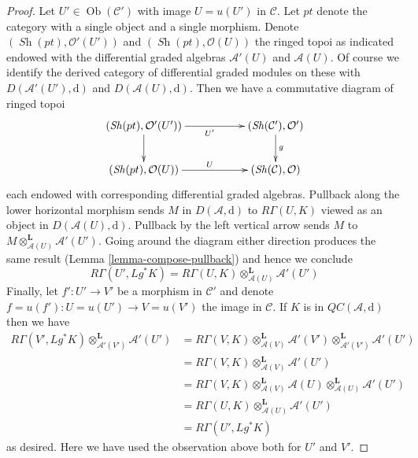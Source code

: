 \documentclass[10pt,a4paper]{amsart}
\theoremstyle{plain}
\theoremstyle{definition}
\theoremstyle{remark}
\numberwithin{equation}{subsection}
\def\Ob{\mathop{\mathrm{Ob}}\nolimits}
\def\Sh{\mathop{\mathit{Sh}}\nolimits}
\begin{document}
\begin{proof}
Let $U' \in \Ob(\mathcal{C}')$ with image $U = u(U')$ in $\mathcal{C}$.
Let $pt$ denote the category with a single object and a single morphism.
Denote $(\Sh(pt), \mathcal{O}'(U'))$ and $(\Sh(pt), \mathcal{O}(U))$
the ringed topoi as indicated endowed with the differential graded
algebras $\mathcal{A}'(U)$ and $\mathcal{A}(U)$.
Of course we identify the derived category of differential graded modules
on these with $D(\mathcal{A}'(U'), \text{d})$ and
$D(\mathcal{A}(U), \text{d})$.
Then we have a commutative diagram of ringed topoi
$$
\xymatrix{
(\Sh(pt), \mathcal{O}'(U')) \ar[rr]_{U'} \ar[d] & &
(\Sh(\mathcal{C}'), \mathcal{O}') \ar[d]^g \\
(\Sh(pt), \mathcal{O}(U)) \ar[rr]^U & &
(\Sh(\mathcal{C}), \mathcal{O})
}
$$
each endowed with corresponding differential graded algebras.
Pullback along the lower horizontal morphism sends $M$ in
$D(\mathcal{A}, \text{d})$ to $R\Gamma(U, K)$ viewed as an
object in $D(\mathcal{A}(U), \text{d})$.
Pullback by the left vertical arrow sends $M$ to
$M \otimes_{\mathcal{A}(U)}^\mathbf{L} \mathcal{A}'(U')$.
Going around the diagram either direction produces the same result
(Lemma \ref{lemma-compose-pullback}) and hence we conclude
$$
R\Gamma(U', Lg^*K) =
R\Gamma(U, K) \otimes_{\mathcal{A}(U)}^\mathbf{L} \mathcal{A}'(U')
$$
Finally, let $f' : U' \to V'$ be a morphism in $\mathcal{C}'$ and
denote $f = u(f') : U = u(U') \to V = u(V')$ the image in $\mathcal{C}$.
If $K$ is in $\mathit{QC}(\mathcal{A}, \text{d})$ then we have
\begin{align*}
R\Gamma(V', Lg^*K) \otimes_{\mathcal{A}'(V')}^\mathbf{L} \mathcal{A}'(U')
& =
R\Gamma(V, K) \otimes_{\mathcal{A}(V)}^\mathbf{L} \mathcal{A}'(V')
\otimes_{\mathcal{A}'(V')}^\mathbf{L} \mathcal{A}'(U') \\
& =
R\Gamma(V, K) \otimes_{\mathcal{A}(V)}^\mathbf{L} \mathcal{A}'(U') \\
& =
R\Gamma(V, K) \otimes_{\mathcal{A}(V)}^\mathbf{L} \mathcal{A}(U)
\otimes_{\mathcal{A}(U)}^\mathbf{L} \mathcal{A}'(U') \\
& =
R\Gamma(U, K) \otimes_{\mathcal{A}(U)}^\mathbf{L} \mathcal{A}'(U') \\
& =
R\Gamma(U', Lg^*K)
\end{align*}
as desired. Here we have used the observation above both for $U'$ and $V'$.
\end{proof}
\end{document}
